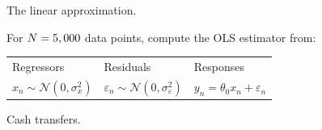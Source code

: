 
\begin{frame}{The linear approximation.}

For $N=5,000$ data points, compute the OLS estimator from:

\vspace{1em}
\begin{tabularx}{\textwidth}{YYY}
    Regressors  &   Residuals   &   Responses \\
    $x_n \sim \mathcal{N}(0, \sigma_x^2)$   &
    $\varepsilon_n \sim \mathcal{N}(0, \sigma_\varepsilon^2)$   &
    $y_n = \theta_0 x_n + \varepsilon_n$
\end{tabularx}
%

\SimGridNormalGraph{}

\end{frame}



\begin{frame}{Cash transfers.}

{
\footnotesize
\CashTransfersResultsTable{}
}

\end{frame}
